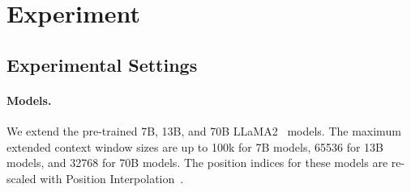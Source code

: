 \documentclass{article} %
\begin{document}
\begin{table}[t]
\begin{center}
\caption{Evaluation on topic retrieval using LongChat~\citep{longchat2023}. We compare our model to other open LLMs with long contexts. This task involves retrieving target topics from a very long conversation with lengths around 3k, 6k, 10k, 13k, and 16k. As some questions in the evaluation set are longer than 16k, our model is fine-tuned via 18k context length upon LLaMA2 13B. It achieves comparable performance to LongChat-13B~\citep{longchat2023}, the state-of-the-art model in this task, while ours is from an efficient fine-tuning manner.}
\label{tab:longchat}
\end{center}
\end{table}
\section{Experiment}
\subsection{Experimental Settings}
\label{exp:setting}
\paragraph{Models.}
We extend the pre-trained 7B, 13B, and 70B LLaMA2~\citep{llama2} models. The maximum extended context window sizes are up to 100k for 7B models, 65536 for 13B models, and 32768 for 70B models. The position indices for these models are re-scaled with Position Interpolation~\citep{position-interpolation}.
\end{document}
